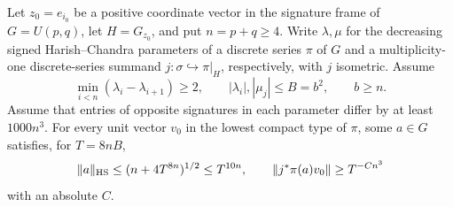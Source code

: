 \begin{auxlemma}\label{lem:weighted-fitted-translate}
Let \(z_0=e_{i_0}\) be a positive coordinate vector in the signature
frame of \(G=U(p,q)\), let \(H=G_{z_0}\), and put \(n=p+q\ge4\).
Write \(\lambda,\mu\) for the decreasing signed Harish--Chandra
parameters of a discrete series \(\pi\) of \(G\) and a
multiplicity-one discrete-series summand \(j:\sigma\hookrightarrow
\pi|_H\), respectively, with \(j\) isometric. Assume
\[
 \min_{i<n}(\lambda_i-\lambda_{i+1})\ge2,\qquad
 |\lambda_i|,|\mu_j|\le B=b^2,\qquad b\ge n.
\]
Assume that entries of opposite signatures in each parameter differ
by at least \(1000n^3\). For every unit vector \(v_0\) in the lowest
compact type of \(\pi\), some \(a\in G\) satisfies, for \(T=8nB\),
\[
 \|a\|_{\rm HS}\le (n+4T^{8n})^{1/2}\le T^{10n},\qquad
 \|j^*\pi(a)v_0\|\ge T^{-C n^3}
\]
with an absolute \(C\).
\end{auxlemma}
